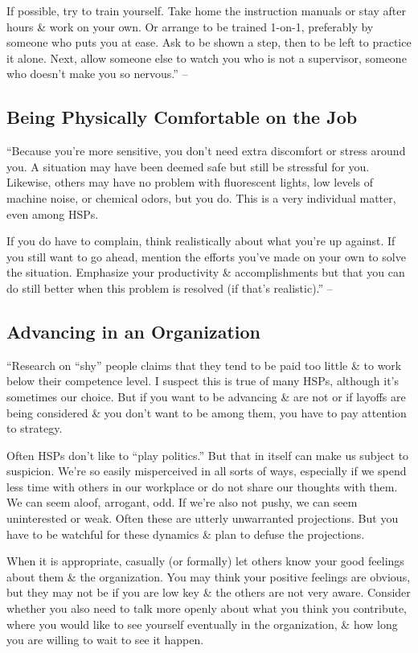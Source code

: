 \documentclass{article}
\numberwithin{equation}{section}
\begin{document}
If possible, try to train yourself. Take home the instruction manuals or stay after hours \& work on your own. Or arrange to be trained 1-on-1, preferably by someone who puts you at ease. Ask to be shown a step, then to be left to practice it alone. Next, allow someone else to watch you who is not a supervisor, someone who doesn't make you so nervous.'' -- \cite[p. 163]{Aron2013}

\subsection{Being Physically Comfortable on the Job}
``Because you're more sensitive, you don't need extra discomfort or stress around you. A situation may have been deemed safe but still be stressful for you. Likewise, others may have no problem with fluorescent lights, low levels of machine noise, or chemical odors, but you do. This is a very individual matter, even among HSPs.

If you do have to complain, think realistically about what you're up against. If you still want to go ahead, mention the efforts you've made on your own to solve the situation. Emphasize your productivity \& accomplishments but that you can do still better when this problem is resolved (if that's realistic).'' -- \cite[p. 163]{Aron2013}

\subsection{Advancing in an Organization}
``Research on ``shy'' people claims that they tend to be paid too little \& to work below their competence level. I suspect this is true of many HSPs, although it's sometimes our choice. But if you want to be advancing \& are not or if layoffs are being considered \& you don't want to be among them, you have to pay attention to strategy.

Often HSPs don't like to ``play politics.'' But that in itself can make us subject to suspicion. We're so easily misperceived in all sorts of ways, especially if we spend less time with others in our workplace or do not share our thoughts with them. We can seem aloof, arrogant, odd. If we're also not pushy, we can seem uninterested or weak. Often these are utterly unwarranted projections. But you have to be watchful for these dynamics \& plan to defuse the projections.

When it is appropriate, casually (or formally) let others know your good feelings about them \& the organization. You may think your positive feelings are obvious, but they may not be if you are low key \& the others are not very aware. Consider whether you also need to talk more openly about what you think you contribute, where you would like to see yourself eventually in the organization, \& how long you are willing to wait to see it happen.
\end{document}
